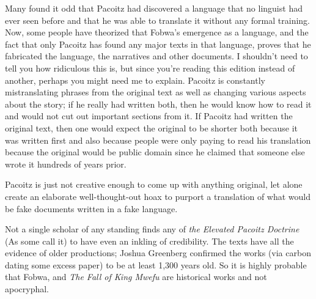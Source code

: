 Many found it odd that Pacoitz had discovered a language that no linguist had ever seen before and that he was able to translate it without any formal training. Now, some people have theorized that Fobwa's emergence as a language, and the fact that only Pacoitz has found any major texts in that language, proves that he fabricated the language, the narratives and other documents. I shouldn't need to tell you how ridiculous this is, but since you're reading this edition instead of another, perhaps you might need me to explain. Pacoitz is constantly mistranslating phrases from the original text as well as changing various aspects about the story; if he really had written both, then he would know how to read it and would not cut out important sections from it. If Pacoitz had written the original text, then one would expect the original to be shorter both because it was written first and also because people were only paying to read his translation because the original would be public domain since he claimed that someone else wrote it hundreds of years prior.

Pacoitz is just not creative enough to come up with anything original, let alone create an elaborate well-thought-out hoax to purport a translation of what would be fake documents written in a fake language.

Not a single scholar of any standing finds any of \emph{the Elevated Pacoitz Doctrine} (As some call it) to have even an inkling of credibility. The texts have all the evidence of older productions; Joshua Greenberg confirmed the works (via carbon dating some excess paper) to be at least 1,300 years old. So it is highly probable that Fobwa, and \emph{The Fall of King Mwefu} are historical works and not apocryphal.


